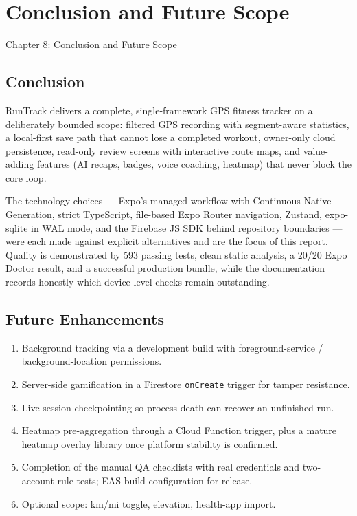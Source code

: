 \documentclass[12pt, a4paper]{report}
\newcommand{\code}[1]{\texttt{#1}}
\begin{document}
\chapter{Conclusion and Future Scope}
          {Chapter 8: Conclusion and Future Scope}

\section{Conclusion}
RunTrack delivers a complete, single-framework GPS fitness tracker on a
deliberately bounded scope: filtered GPS recording with segment-aware
statistics, a local-first save path that cannot lose a completed workout,
owner-only cloud persistence, read-only review screens with interactive route
maps, and value-adding features (AI recaps, badges, voice coaching, heatmap)
that never block the core loop.

The technology choices --- Expo's managed workflow with Continuous Native
Generation, strict TypeScript, file-based Expo Router navigation, Zustand,
expo-sqlite in WAL mode, and the Firebase JS SDK behind repository boundaries
--- were each made against explicit alternatives and are the focus of this
report. Quality is demonstrated by 593 passing tests, clean static analysis,
a 20/20 Expo Doctor result, and a successful production bundle, while the
documentation records honestly which device-level checks remain outstanding.

\section{Future Enhancements}
\begin{enumerate}[leftmargin=1.2cm]
  \item Background tracking via a development build with foreground-service /
        background-location permissions.
  \item Server-side gamification in a Firestore \code{onCreate} trigger for
        tamper resistance.
  \item Live-session checkpointing so process death can recover an unfinished
        run.
  \item Heatmap pre-aggregation through a Cloud Function trigger, plus a
        mature heatmap overlay library once platform stability is confirmed.
  \item Completion of the manual QA checklists with real credentials and
        two-account rule tests; EAS build configuration for release.
  \item Optional scope: km/mi toggle, elevation, health-app import.
\end{enumerate}
\end{document}
